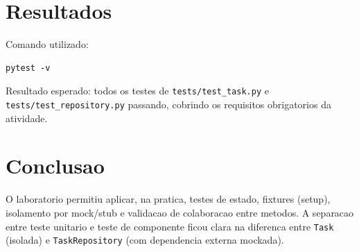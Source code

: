 \documentclass[11pt,a4paper]{article}
\begin{document}
\section{Resultados}
Comando utilizado:
\begin{lstlisting}
pytest -v
\end{lstlisting}

Resultado esperado: todos os testes de \texttt{tests/test\_task.py} e \texttt{tests/test\_repository.py} passando, cobrindo os requisitos obrigatorios da atividade.

\section{Conclusao}
O laboratorio permitiu aplicar, na pratica, testes de estado, fixtures (setup), isolamento por mock/stub e validacao de colaboracao entre metodos. A separacao entre teste unitario e teste de componente ficou clara na diferenca entre \texttt{Task} (isolada) e \texttt{TaskRepository} (com dependencia externa mockada).
\end{document}
